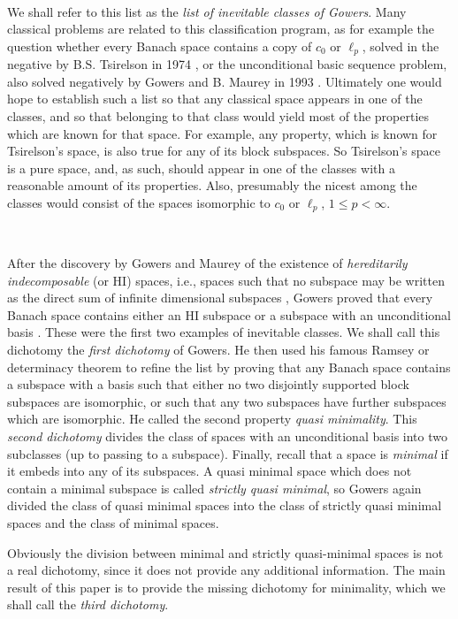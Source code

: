 \documentclass[10pt]{amsart}
\numberwithin{equation}{section}
\begin{document}
\

We shall refer to this list as the {\em list of  inevitable classes of Gowers}.
Many classical problems are related to this classification program, as for
example the question whether every Banach space contains a copy of $c_0$ or
$\ell_p$, solved in the negative by B.S. Tsirelson in 1974 \cite{tsi}, or the
unconditional basic sequence problem, also solved negatively by Gowers and B.
Maurey in 1993 \cite{GM}.  Ultimately one would hope to establish such a list
so that any classical space appears in one of the classes, and so that
belonging to that class would yield most of the properties which are known for
that space. For example, any property, which is known for Tsirelson's space, is
also true for any of its block subspaces. So Tsirelson's space is a pure space,
and, as such, should appear in one of the classes with a reasonable amount of
its properties. Also, presumably the nicest among the classes would consist of
the spaces isomorphic to $c_0$ or $\ell_p$, $1 {\ensuremath{\leqslant}} p<\infty$.

\

After the discovery by Gowers and Maurey of the existence of {\em hereditarily
indecomposable} (or HI) spaces, i.e., spaces such that no subspace may be
written as the direct sum of infinite dimensional subspaces \cite{GM}, Gowers
proved that every Banach space contains either an HI subspace or a subspace
with an unconditional basis \cite{g:hi}. These were the first two examples of
inevitable classes. We shall call this dichotomy the {\em first dichotomy} of
Gowers. He then used his famous Ramsey or determinacy theorem \cite{g:dicho} to
refine the list by proving that any Banach space contains a subspace with a
basis such that either no two disjointly supported block subspaces are
isomorphic, or such that any two subspaces have further subspaces which are
isomorphic. He called the second property {\em quasi minimality}. This {\em
second dichotomy} divides the class of spaces with an unconditional basis into
two subclasses (up to passing to a subspace). Finally, recall that a space is
{\em minimal} if it embeds into any of its subspaces. A quasi minimal space
which does not contain a minimal subspace is called {\em strictly quasi
minimal}, so Gowers again divided the class of quasi minimal spaces into the
class of strictly quasi minimal spaces and the class of minimal spaces.

Obviously the division between minimal and strictly quasi-minimal spaces is not
a real dichotomy, since it does not provide any additional information. The
main result of this paper is to provide the missing dichotomy for minimality,
which we shall call the {\em third dichotomy}.
\end{document}

